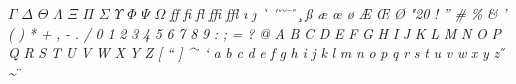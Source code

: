 \documentclass{article}
\begin{document}
\noindent $\mathit{\Gamma}$ $\mathit{\Delta}$ $\mathit{\Theta}$ $\mathit{\Lambda}$ $\mathit{\Xi}$ $\mathit{\Pi}$ $\mathit{\Sigma}$ $\mathit{\Upsilon}$ $\mathit{\Phi}$ $\mathit{\Psi}$ $\mathit{\Omega}$ \textit{ff} \textit{fi} \textit{fl} \textit{ffi} \textit{ffl} \textit{\i} \textit{\j} \textit{\`} \textit{\'} \textit{\v} \textit{\u} \textit{\=} \textit{\r} \textit{\c} \textit{\ss} \textit{\ae} \textit{\oe} \textit{\o} \textit{\AE} \textit{\OE} \textit{\O} \textit{\selectfont\char"20} \textit{!} \textit{\textquotedblright} \textit{\#} \textit{\textsterling} \textit{\%} \textit{\&} \textit{'} \textit{(} \textit{)} \textit{*} \textit{+} \textit{,} \textit{-} \textit{.} \textit{/} \textit{0} \textit{1} \textit{2} \textit{3} \textit{4} \textit{5} \textit{6} \textit{7} \textit{8} \textit{9} \textit{:} \textit{;} \textit{\textexclamdown} \textit{=} \textit{\textquestiondown} \textit{?} \textit{@} \textit{A} \textit{B} \textit{C} \textit{D} \textit{E} \textit{F} \textit{G} \textit{H} \textit{I} \textit{J} \textit{K} \textit{L} \textit{M} \textit{N} \textit{O} \textit{P} \textit{Q} \textit{R} \textit{S} \textit{T} \textit{U} \textit{V} \textit{W} \textit{X} \textit{Y} \textit{Z} \textit{[} \textit{\textquotedblleft} \textit{]} \textit{\^} \textit{\.} \textit{\textquoteleft} \textit{a} \textit{b} \textit{c} \textit{d} \textit{e} \textit{f} \textit{g} \textit{h} \textit{i} \textit{j} \textit{k} \textit{l} \textit{m} \textit{n} \textit{o} \textit{p} \textit{q} \textit{r} \textit{s} \textit{t} \textit{u} \textit{v} \textit{w} \textit{x} \textit{y} \textit{z} \textit{\textendash} \textit{\textemdash} \textit{\H} \textit{\~} \textit{\"}
\end{document}
